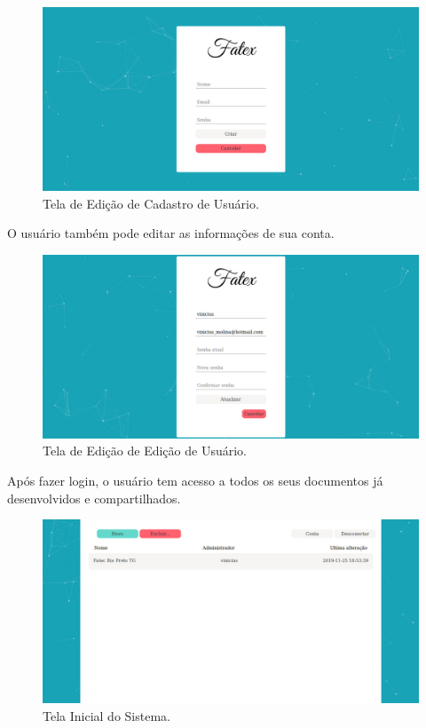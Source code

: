\documentclass[article,12pt,oneside,a4paper,english,brazil,sumario=tradicional]{abntex2}
\begin{document}
  \begin{figure}[H]
    \centering
    \caption{Tela de Edição de Cadastro de Usuário.}
    \includegraphics[width=16cm]{figures/Tela Criar Usuario - FATEX.jpeg}
  \end{figure}


O usuário também pode editar as informações de sua conta.


  \begin{figure}[H]
    \centering
    \caption{Tela de Edição de Edição de Usuário.}
    \includegraphics[width=16cm]{figures/Tela Editar Usuario - FATEX.jpeg}
  \end{figure}


Após fazer login, o usuário tem acesso a todos os seus documentos já desenvolvidos e compartilhados.


  \begin{figure}[H]
    \centering
    \caption{Tela Inicial do Sistema.}
    \includegraphics[width=16cm]{figures/Tela Inicial - FATEX.jpeg}
  \end{figure}
\end{document}
